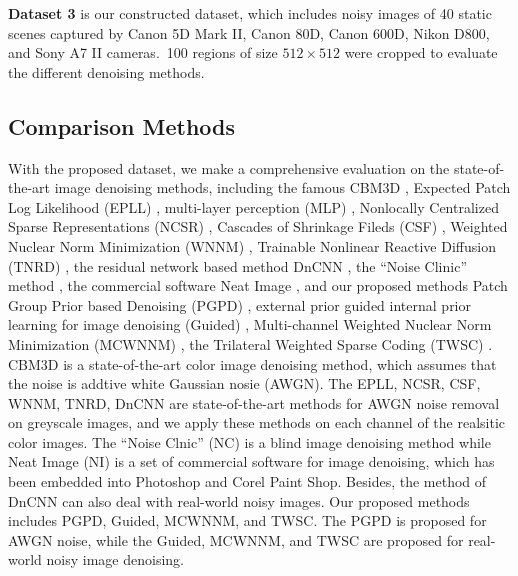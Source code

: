 \textbf{Dataset 3} is our constructed dataset, which includes noisy images of 40 static scenes captured by Canon 5D Mark II, Canon 80D, Canon 600D, Nikon D800, and Sony A7 II cameras.\ 100 regions of size $512\times512$ were cropped to evaluate the different denoising methods.


\subsection{Comparison Methods}

With the proposed dataset, we make a comprehensive evaluation on the state-of-the-art image denoising methods, including the famous CBM3D \cite{cbm3d}, Expected Patch Log Likelihood (EPLL) \cite{epll}, multi-layer perception (MLP) \cite{mlp}, Nonlocally Centralized Sparse Representations (NCSR) \cite{ncsr}, Cascades of Shrinkage Fileds (CSF) \cite{csf}, Weighted Nuclear Norm Minimization (WNNM) \cite{wnnm}, Trainable Nonlinear Reactive Diffusion (TNRD) \cite{tnrd}, the residual network based method DnCNN \cite{dncnn}, the ``Noise Clinic'' method \cite{noiseclinic,ncwebsite}, the commercial software Neat Image \cite{neatimage}, and our proposed methods Patch Group Prior based Denoising (PGPD) \cite{pgpd}, external prior guided internal prior learning for image denoising (Guided) \cite{guided}, Multi-channel Weighted Nuclear Norm Minimization (MCWNNM) \cite{mcwnnm}, the Trilateral Weighted Sparse Coding (TWSC) \cite{twsc}. CBM3D is a state-of-the-art color image denoising method, which assumes that the noise is addtive white Gaussian nosie (AWGN). The EPLL, NCSR, CSF, WNNM, TNRD, DnCNN are state-of-the-art methods for AWGN noise removal on greyscale images, and we apply these methods on each channel of the realsitic color images.  The ``Noise Clnic'' (NC) is a blind image denoising method while Neat Image (NI) is a set of commercial software for image denoising, which has been embedded into Photoshop and Corel Paint Shop. Besides, the method of DnCNN \cite{dncnn} can also deal with real-world noisy images. Our proposed methods includes PGPD, Guided, MCWNNM, and TWSC. The PGPD is proposed for AWGN noise, while the Guided, MCWNNM, and TWSC are proposed for real-world noisy image denoising.

